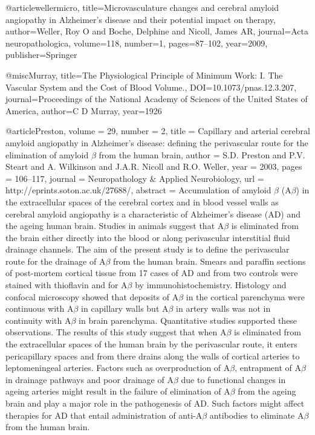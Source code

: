 @article{wellermicro,
  title={Microvasculature changes and cerebral amyloid angiopathy in Alzheimer’s disease and their potential impact on therapy},
  author={Weller, Roy O and Boche, Delphine and Nicoll, James AR},
  journal={Acta neuropathologica},
  volume={118},
  number={1},
  pages={87--102},
  year={2009},
  publisher={Springer}
}


@misc{Murray, 
title={The Physiological Principle of Minimum Work: I. The Vascular System and the Cost of Blood Volume.}, DOI={10.1073/pnas.12.3.207}, 
journal={Proceedings of the National Academy of Sciences of the United States of America}, 
author={C D Murray}, 
year={1926}}

@article{Preston,
          volume = {29},
          number = {2},
           title = {Capillary and arterial cerebral amyloid angiopathy in Alzheimer's disease: defining the perivascular route for the elimination of amyloid {\ensuremath{\beta}} from the human brain},
          author = {S.D. Preston and P.V. Steart and A. Wilkinson and J.A.R. Nicoll and R.O. Weller},
            year = {2003},
           pages = {106--117},
         journal = {Neuropathology \& Applied Neurobiology},
             url = {http://eprints.soton.ac.uk/27688/},
        abstract = {Accumulation of amyloid {\ensuremath{\beta}} (A{\ensuremath{\beta}}) in the extracellular spaces of the cerebral cortex and in blood vessel walls as cerebral amyloid angiopathy is a characteristic of Alzheimer's disease (AD) and the ageing human brain. Studies in animals suggest that A{\ensuremath{\beta}} is eliminated from the brain either directly into the blood or along perivascular interstitial fluid drainage channels. The aim of the present study is to define the perivascular route for the drainage of A{\ensuremath{\beta}} from the human brain. Smears and paraffin sections of post-mortem cortical tissue from 17 cases of AD and from two controls were stained with thioflavin and for A{\ensuremath{\beta}} by immunohistochemistry. Histology and confocal microscopy showed that deposits of A{\ensuremath{\beta}} in the cortical parenchyma were continuous with A{\ensuremath{\beta}} in capillary walls but A{\ensuremath{\beta}} in artery walls was not in continuity with A{\ensuremath{\beta}} in brain parenchyma. Quantitative studies supported these observations. The results of this study suggest that when A{\ensuremath{\beta}} is eliminated from the extracellular spaces of the human brain by the perivascular route, it enters pericapillary spaces and from there drains along the walls of cortical arteries to leptomeningeal arteries. Factors such as overproduction of A{\ensuremath{\beta}}, entrapment of A{\ensuremath{\beta}} in drainage pathways and poor drainage of A{\ensuremath{\beta}} due to functional changes in ageing arteries might result in the failure of elimination of A{\ensuremath{\beta}} from the ageing brain and play a major role in the pathogenesis of AD. Such factors might affect therapies for AD that entail administration of anti-A{\ensuremath{\beta}} antibodies to eliminate A{\ensuremath{\beta}} from the human brain.}
}

